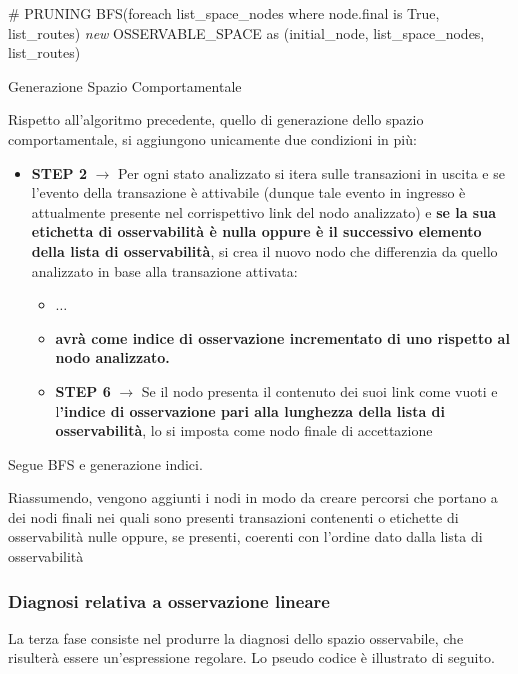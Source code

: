 \begin{algorithm}[H]
\SetAlgoLined
\resumenumbering
{}
 \# PRUNING\;
 BFS(foreach list\_space\_nodes where node.final is True, list\_routes)\;
 \textit{new} OSSERVABLE\_SPACE as (initial\_node, list\_space\_nodes, list\_routes)
 \caption{Generazione Spazio Comportamentale}
\end{algorithm}
Rispetto all'algoritmo precedente, quello di generazione dello spazio comportamentale, si aggiungono unicamente due condizioni in più:

\begin{itemize}
    \item \textbf{STEP 2} $\rightarrow $ Per ogni stato analizzato si itera sulle transazioni in uscita e se l’evento della transazione è attivabile (dunque tale evento in ingresso è attualmente presente nel corrispettivo link del nodo analizzato) e \textbf{se la sua etichetta di osservabilità è nulla oppure è il successivo elemento della lista di osservabilità}, si crea il nuovo nodo che differenzia da quello analizzato in base alla transazione attivata:
    \begin{itemize}
        \item $\dots$
        \item \textbf{avrà come indice di osservazione incrementato di uno rispetto al nodo analizzato.}
    \item \textbf{STEP 6} $\rightarrow $ Se il nodo presenta il contenuto dei suoi link come vuoti e l\textbf{’indice di osservazione pari alla lunghezza della lista di osservabilità}, lo si imposta come nodo finale di accettazione
    \end{itemize}
\end{itemize}
Segue BFS e generazione indici.

Riassumendo, vengono aggiunti i nodi in modo da creare percorsi che portano a dei nodi finali nei quali sono presenti transazioni contenenti o etichette di osservabilità nulle oppure, se presenti, coerenti con l’ordine dato dalla lista di osservabilità
\subsubsection{Diagnosi relativa a osservazione lineare}
La terza fase consiste nel produrre la diagnosi dello spazio osservabile, che risulterà essere un'espressione regolare.
Lo pseudo codice è illustrato di seguito.

